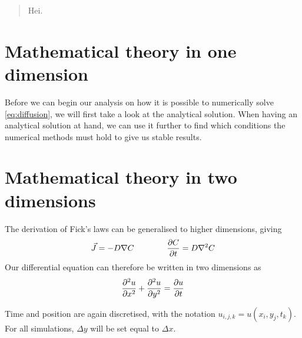 

\begin{abstract}
Hei.
\end{abstract}
\listoftodos
\clearpage





\section{Mathematical theory in one dimension}
Before we can begin our analysis on how it is possible to numerically solve \vref{eq:diffusion}, we will first take a look at the analytical solution. When having an analytical solution at hand, we can use it further to find which conditions the numerical methods must hold to give us stable results.











\section{Mathematical theory in two dimensions}
The derivation of Fick's laws can be generalised to higher dimensions, giving
\[
    \vec{J} = -D\nabla C \qquad\qquad \pdv{C}{t} = D\nabla^2C
\]
Our differential equation can therefore be written in two dimensions as
\begin{equation} \label{eq:twoDim}
\pdv[2]{u}{x} + \pdv[2]{u}{y} = \pdv{u}{t}
\end{equation}

Time and position are again discretised, with the notation \(u_{i,j,k} = u(x_i,y_j,t_k)\). For all simulations, \(\Delta y\) will be set equal to \(\Delta x\).







\clearpage
{}
\nocite{tveito2004introduction}
\printbibliography
\newpage

\setcounter{section}{0}
\renewcommand{\thesection}{Appendix \Alph{section}}




